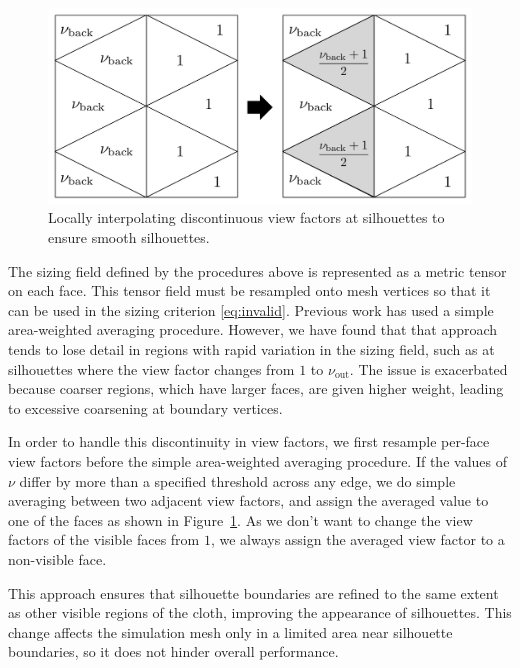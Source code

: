 \documentclass[10pt,journal,compsoc,twoside]{TexInputs/IEEEtran}
\newcommand{\rahul}[1]{\textcolor{blue}{(#1 ---Rahul)}}
\begin{document}
\begin{figure}[t]
    \centering
    \includegraphics[width=0.8\columnwidth]{silhouette_preserving}
    \caption{Locally interpolating discontinuous view factors at silhouettes to ensure smooth silhouettes.}
    \label{fig:silhouette_preserving}
\end{figure}

The sizing field defined by the procedures above is represented as a metric tensor on each face.
This tensor field must be resampled onto mesh vertices so that it can be used in the sizing criterion
\eqref{eq:invalid}.  Previous work \cite{Narain:2012:AAR} has used a simple area-weighted
averaging procedure. However, we have found that that approach tends to lose detail in
regions with rapid variation in the sizing field, such as at silhouettes where the view
factor changes from $1$ to $\nu_{\text{out}}$. The issue is exacerbated because coarser
regions, which have larger faces, are given higher weight, leading to excessive coarsening
at boundary vertices.

In order to handle this discontinuity in view factors, we first resample per-face view
factors before the simple area-weighted averaging procedure. If the values of $\nu$ differ by more than a specified threshold across any edge, we do simple
averaging between two adjacent view factors, and assign the averaged value to one
of the faces as shown in Figure~\ref{fig:silhouette_preserving}. As we don't want to
change the view factors of the visible faces from $1$, we always assign the
averaged view factor to a non-visible face.

This approach ensures that silhouette boundaries are refined to the same extent
as other visible regions of the cloth, improving the appearance of silhouettes.
This change affects the simulation mesh only in a limited area near silhouette
boundaries, so it does not hinder overall performance.
\end{document}
